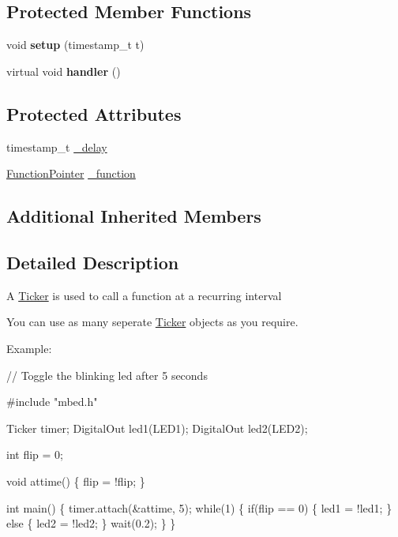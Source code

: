 \subsection*{Protected Member Functions}
\begin{DoxyCompactItemize}
\item 
void {\bfseries setup} (timestamp\+\_\+t t)\hypertarget{classmbed_1_1_ticker_aec593bf08c90b657a84f128eef3c3914}{}\label{classmbed_1_1_ticker_aec593bf08c90b657a84f128eef3c3914}

\item 
virtual void {\bfseries handler} ()\hypertarget{classmbed_1_1_ticker_a9e700f503716083f8549eec801f13710}{}\label{classmbed_1_1_ticker_a9e700f503716083f8549eec801f13710}

\end{DoxyCompactItemize}
\subsection*{Protected Attributes}
\begin{DoxyCompactItemize}
\item 
timestamp\+\_\+t \hyperlink{classmbed_1_1_ticker_aeadd82ef601473e6dfb7a16d86568731}{\+\_\+delay}
\item 
\hyperlink{classmbed_1_1_function_pointer_arg1}{Function\+Pointer} \hyperlink{classmbed_1_1_ticker_a1258396e7210d369b75fc227ea1dce4d}{\+\_\+function}
\end{DoxyCompactItemize}
\subsection*{Additional Inherited Members}


\subsection{Detailed Description}
A \hyperlink{classmbed_1_1_ticker}{Ticker} is used to call a function at a recurring interval

You can use as many seperate \hyperlink{classmbed_1_1_ticker}{Ticker} objects as you require.

Example\+: 
\begin{DoxyCode}
\textcolor{comment}{// Toggle the blinking led after 5 seconds}

\textcolor{preprocessor}{#include "mbed.h"}

Ticker timer;
DigitalOut led1(LED1);
DigitalOut led2(LED2);

\textcolor{keywordtype}{int} flip = 0;

\textcolor{keywordtype}{void} attime() \{
    flip = !flip;
\}

\textcolor{keywordtype}{int} main() \{
    timer.attach(&attime, 5);
    \textcolor{keywordflow}{while}(1) \{
        \textcolor{keywordflow}{if}(flip == 0) \{
            led1 = !led1;
        \} \textcolor{keywordflow}{else} \{
            led2 = !led2;
        \}
        wait(0.2);
    \}
\}
\end{DoxyCode}
 

